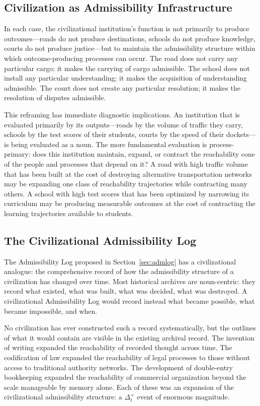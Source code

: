 \documentclass[12pt, a4paper]{article}
\theoremstyle{plain}
\theoremstyle{definition}
\theoremstyle{remark}
\begin{document}
\subsection{Civilization as Admissibility Infrastructure}

In each case, the civilizational institution's function is not primarily
to produce outcomes---roads do not produce destinations, schools do not
produce knowledge, courts do not produce justice---but to maintain the
admissibility structure within which outcome-producing processes can occur.
The road does not carry any particular cargo; it makes the carrying of
cargo admissible. The school does not install any particular understanding;
it makes the acquisition of understanding admissible. The court does not
create any particular resolution; it makes the resolution of disputes
admissible.

This reframing has immediate diagnostic implications. An institution that
is evaluated primarily by its outputs---roads by the volume of traffic they
carry, schools by the test scores of their students, courts by the speed
of their dockets---is being evaluated as a noun. The more fundamental
evaluation is process-primary: does this institution maintain, expand, or
contract the reachability cone of the people and processes that depend on
it? A road with high traffic volume that has been built at the cost of
destroying alternative transportation networks may be expanding one class
of reachability trajectories while contracting many others. A school with
high test scores that has been optimized by narrowing its curriculum may
be producing measurable outcomes at the cost of contracting the learning
trajectories available to students.

\subsection{The Civilizational Admissibility Log}

The Admissibility Log proposed in Section~\ref{sec:admlog} has a
civilizational analogue: the comprehensive record of how the admissibility
structure of a civilization has changed over time. Most historical archives
are noun-centric: they record what existed, what was built, what was
decided, what was destroyed. A civilizational Admissibility Log would
record instead what became possible, what became impossible, and when.

No civilization has ever constructed such a record systematically, but
the outlines of what it would contain are visible in the existing archival
record. The invention of writing expanded the reachability of recorded
thought across time. The codification of law expanded the reachability of
legal processes to those without access to traditional authority networks.
The development of double-entry bookkeeping expanded the reachability of
commercial organization beyond the scale manageable by memory alone. Each
of these was an expansion of the civilizational admissibility structure:
a $\Delta_t^+$ event of enormous magnitude.
\end{document}
